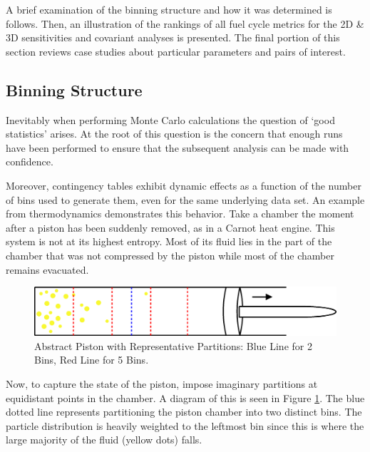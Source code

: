 A brief examination of the binning structure and how it was determined is follows. 
Then, an illustration of the rankings of all fuel cycle metrics for the 2D \& 3D sensitivities 
and covariant analyses is presented.  The final portion of this section reviews case studies 
about particular parameters and pairs of interest.


\subsection{Binning Structure}
\label{cts_sec:binning}

Inevitably when performing Monte Carlo calculations the question of `good statistics' arises.  
At the root of this question is the concern that enough runs
have been performed to ensure that the subsequent analysis can be made with confidence. 

Moreover, contingency tables exhibit dynamic effects as a function of the number of bins used to 
generate them, even for the same underlying data set.  An example from
thermodynamics demonstrates this behavior.  Take a chamber the moment after a piston has been 
suddenly removed, as in a Carnot heat engine.
This system is not at its highest entropy.  Most of its fluid lies in the part of the chamber 
that was not compressed by the piston while most of the
chamber remains evacuated.

\begin{figure}[htbp]
\begin{center}
\includegraphics[scale=0.50]{ct_sensitivity/figs/PistonCT.eps}
\caption{Abstract Piston with Representative Partitions: Blue Line for 2 Bins, Red Line for 5 Bins.}
\label{piston_ct}
\end{center}
\end{figure}

Now, to capture the state of the piston, impose imaginary partitions at equidistant points in the 
chamber.  A diagram of this is seen in Figure \ref{piston_ct}.  The blue
dotted line represents partitioning the piston chamber into two distinct bins.  The particle 
distribution is heavily weighted to the leftmost bin
since this is where the large majority of the fluid (yellow dots) falls.  

